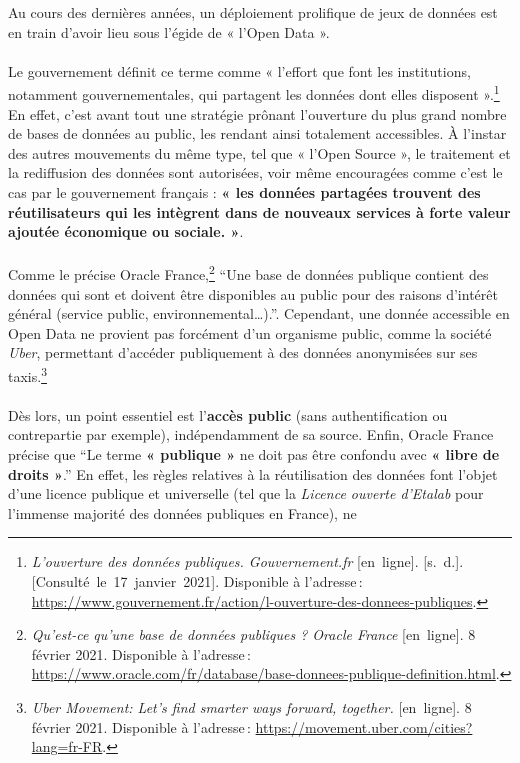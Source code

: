 \documentclass[
  11pt,
  french,
]{article}
\begin{document}
Au cours des dernières années, un déploiement prolifique de jeux de
données est en train d'avoir lieu sous l'égide de « l'Open Data ».\\
~\\
Le gouvernement définit ce terme comme « l'effort que font les
institutions, notamment gouvernementales, qui partagent les données dont
elles disposent ».\footnote{\emph{L'ouverture des données publiques.
  Gouvernement.fr} {[}en~ligne{]}. {[}s.~d.{]}.
  {[}Consulté~le~17~janvier~2021{]}. Disponible à l'adresse\,:
  \url{https://www.gouvernement.fr/action/l-ouverture-des-donnees-publiques}.}
En effet, c'est avant tout une stratégie prônant l'ouverture du plus
grand nombre de bases de données au public, les rendant ainsi totalement
accessibles. À l'instar des autres mouvements du même type, tel que «
l'Open Source », le traitement et la rediffusion des données sont
autorisées, voir même encouragées comme c'est le cas par le gouvernement
français : \textbf{« les données partagées trouvent des réutilisateurs
qui les intègrent dans de nouveaux services à forte valeur ajoutée
économique ou sociale. »}.\\
~\\
Comme le précise Oracle France,\footnote{\emph{Qu'est-ce qu'une base de
  données publiques ? \textbar{} Oracle France} {[}en~ligne{]}. 8
  février 2021. Disponible à l'adresse\,:
  \url{https://www.oracle.com/fr/database/base-donnees-publique-definition.html}.}
``Une base de données publique contient des données qui sont et doivent
être disponibles au public pour des raisons d'intérêt général (service
public, environnemental\ldots).''. Cependant, une donnée accessible en
Open Data ne provient pas forcément d'un organisme public, comme la
société \emph{Uber}, permettant d'accéder publiquement à des données
anonymisées sur ses taxis.\footnote{\emph{Uber Movement: Let's find
  smarter ways forward, together.} {[}en~ligne{]}. 8 février 2021.
  Disponible à l'adresse\,:
  \url{https://movement.uber.com/cities?lang=fr-FR}.}\\
~\\
Dès lors, un point essentiel est l'\textbf{accès public} (sans
authentification ou contrepartie par exemple), indépendamment de sa
source. Enfin, Oracle France précise que ``Le terme \textbf{« publique
»} ne doit pas être confondu avec \textbf{« libre de droits »}.'' En
effet, les règles relatives à la réutilisation des données font l'objet
d'une licence publique et universelle (tel que la \emph{Licence ouverte
d'Etalab} pour l'immense majorité des données publiques en France), ne
\end{document}
